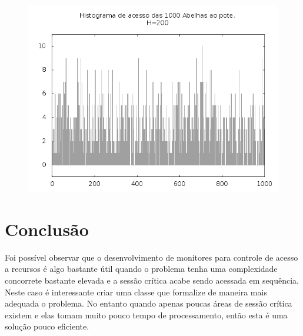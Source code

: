 \documentclass[12pt,a4paper]{article}
\begin{document}
\begin{figure}[!htb]
\centering
\includegraphics[width=0.7\paperwidth]{./graficos/histograma_1000_1_200_1000_10.png}
\label{Rotulo}
\end{figure}

\clearpage
\section{Conclusão}

Foi possível observar que o desenvolvimento de monitores para controle de acesso a recursos é algo bastante útil quando o problema tenha uma complexidade concorrete bastante elevada e a sessão crítica acabe sendo acessada em sequência. Neste caso é interessante criar uma classe que formalize de maneira mais adequada o problema. No entanto quando apenas poucas áreas de sessão crítica existem e elas tomam muito pouco tempo de processamento, então esta é uma solução pouco eficiente.
\end{document}
